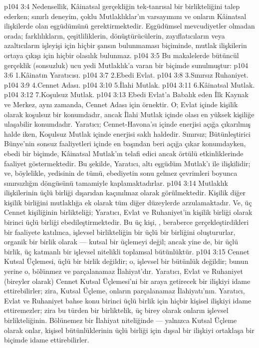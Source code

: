 \vs p104 3:4 Nedensellik, Kâinatsal gerçekliğin tek\hyp{}tanrısal bir birlikteliğini talep ederken; sınırlı deneyim, çoklu Mutlaklıklar’ın varsayımını ve onların Kâinatsal ilişkilerde olan eşgüdümünü gerektirmektedir. Eşgüdümsel mevcudiyetler olmadan orada; farklılıkların, çeşitliliklerin, dönüştürücülerin, zayıflatıcıların veya azaltıcıların işleyişi için hiçbir şansın bulunmaması biçiminde, mutlak ilişkilerin ortaya çıkışı için hiçbir olasılık bulunmaz.
\vs p104 3:5 Bu makalelerde bütüncül gerçeklik (sonsuzluk) ucu yedi Mutlaklık’a varan bir biçimde sunulmuştur:
\vs p104 3:6 1.\bibnobreakspace Kâinatın Yaratıcısı.
\vs p104 3:7 2.\bibnobreakspace Ebedi Evlat.
\vs p104 3:8 3.\bibnobreakspace Sınırsız Ruhaniyet.
\vs p104 3:9 4.\bibnobreakspace Cennet Adası.
\vs p104 3:10 5.\bibnobreakspace İlahi Mutlak.
\vs p104 3:11 6.\bibnobreakspace Kâinatsal Mutlak.
\vs p104 3:12 7.\bibnobreakspace Koşulsuz Mutlak.
\vs p104 3:13 Ebedi Evlat’a Babalık eden İlk Kaynak ve Merkez, aynı zamanda, Cennet Adası için örnektir. O; Evlat içinde kişilik olarak koşulsuz bir konumdadır, ancak İlahi Mutlak içinde olası en yüksek kişiliğe ulaşabilir konumdadır. Yaratıcı; Cennet\hyp{}Havona’sı içinde enerjisi açığa çıkarılmış halde iken, Koşulsuz Mutlak içinde enerjisi saklı haldedir. Sınırsız; Bütünleştirici Bünye’nin sonsuz faaliyetleri içinde en başından beri açığa çıkar konumdayken, ebedi bir biçimde, Kâinatsal Mutlak’ın telafi edici ancak örtülü etkinliklerinde faaliyet göstermektedir. Bu şekilde, Yaratıcı, altı eşgüdüm Mutlak’ı ile ilişkilidir; ve, böylelikle, yedisinin de tümü, ebediyetin sonu gelmez çevrimleri boyunca sınırsızlığın döngüsünü tamamiyle kaplamaktadırlar.
\vs p104 3:14 Mutlaklık ilişkilerinin üçlü birliği dışarıdan kaçınılmaz olarak görülmektedir. Kişilik diğer kişilik birliğini mutlaklığa ek olarak tüm diğer düzeylerde arzulamaktadır. Ve, üç Cennet kişiliğinin birlikteliği; Yaratıcı, Evlat ve Ruhaniyet’in kişilik birliği olarak birinci üçlü birliği ebedileştirmektedir. Bu üç kişi, , beraberce gerçekleştirdikleri bir faaliyete katılınca, işlevsel birlikteliğin bir üçlü bir birliğini oluştururlar, organik bir birlik olarak --- kutsal bir üçlemeyi değil; ancak yine de, bir üçlü birlik, üç katmanlı bir işlevsel nitelikli toplamsal bütünlüktür.
\vs p104 3:15 Cennet Kutsal Üçlemesi, üçlü bir birlik değildir; o, işlevsel bir bütünlük değildir; bunun yerine o, bölünmez ve parçalanamaz İlahiyat’dır. Yaratıcı, Evlat ve Ruhaniyet (bireyler olarak) Cennet Kutsal Üçlemesi’ni bir araya getirecek bir ilişkiyi idame ettirebilirler; zira, Kutsal Üçleme, onların parçalanamaz İlahiyatı’nın. Yaratıcı, Evlat ve Ruhaniyet bahse konu birinci üçlü birlik için hiçbir kişisel ilişkiyi idame ettiremezler; zira bu türden bir birliktelik, üç birey olarak onların işlevsel birlikteliğinin. Bölünemez bir İlahiyat niteliğinde --- yalnızca Kutsal Üçleme olarak onlar, kişisel bütünlüklerinin üçlü birliği için dışsal bir ilişkiyi ortaklaşa bir biçimde idame ettirebilirler.
